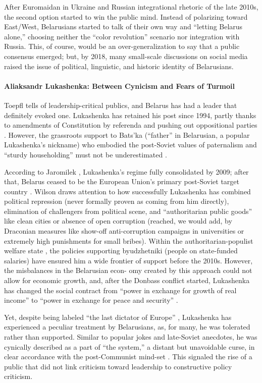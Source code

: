 After Euromaidan in Ukraine and Russian integrational rhetoric of the late 2010s, the second option started to win the public mind. Instead of polarizing toward East/West, Belarusians started to talk of their own way and “letting Belarus alone,” choosing neither the “color revolution” scenario nor integration with Russia. This, of course, would be an over-generalization to say that a public consensus emerged; but, by 2018, many small-scale discussions on social media raised the issue of political, linguistic, and historic identity of Belarusians.

\paragraph{Aliaksandr Lukashenka: Between Cynicism and Fears of Turmoil}
Toepfl \cite{Toepfl} tells of leadership-critical publics, and Belarus has had a leader that definitely evoked one. Lukashenka has retained his post since 1994, partly thanks to amendments of Constitution by referenda and pushing out oppositional parties \cite{KorostelevaLawsonMarsh}. However, the grassroots support to Bats’ka (“father” in Belarusian, a popular Lukashenka’s nickname) who embodied the post-Soviet values of paternalism and “sturdy householding” must not be underestimated \cite{OhanaGenerale}.

According to Jaromilek \cite[p.~87]{Jaromilek}, Lukashenka’s regime fully consolidated by 2009; after that, Belarus ceased to be the European Union’s primary post-Soviet target country \cite{Marples2009}. Wilson \cite{Wilson2021} draws attention to how successfully Lukashenka has combined political repression (never formally proven as coming from him directly), elimination of challengers from political scene, and “authoritarian public goods” like clean cities or absence of open corruption (reached, we would add, by Draconian measures like show-off anti-corruption campaigns in universities or extremely high punishments for small bribes). Within the authoritarian-populist welfare state \cite{HortZakharov}, the policies supporting byudzhetniki (people on state-funded salaries) have ensured him a wide frontier of support before the 2010s. However, the misbalances in the Belarusian econ- omy created by this approach could not allow for economic growth, and, after the Donbass conflict started, Lukashenka has changed the social contract from “power in exchange for growth of real income” to “power in exchange for peace and security” \cite{Nikolyuk}.

Yet, despite being labeled “the last dictator of Europe” \cite{Wilson2021}, Lukashenka has experienced a peculiar treatment by Belarusians, as, for many, he was tolerated rather than supported. Similar to popular jokes and late-Soviet anecdotes, he was cynically described as a part of “the system,” a distant but unavoidable curse, in clear accordance with the post-Communist mind-set \cite{Schopflin}. This signaled the rise of a public that did not link criticism toward leadership to constructive policy criticism.

